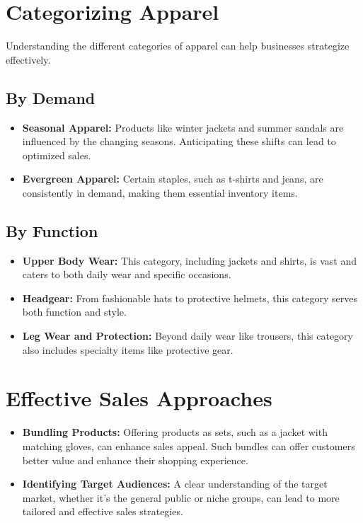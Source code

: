 \documentclass{article}
\begin{document}
\section{Categorizing Apparel}
Understanding the different categories of apparel can help businesses strategize effectively.
\subsection{By Demand}
\begin{itemize}
    \item \textbf{Seasonal Apparel:} Products like winter jackets and summer sandals are influenced by the changing seasons. Anticipating these shifts can lead to optimized sales.
    \item \textbf{Evergreen Apparel:} Certain staples, such as t-shirts and jeans, are consistently in demand, making them essential inventory items.
\end{itemize}
\subsection{By Function}
\begin{itemize}
    \item \textbf{Upper Body Wear:} This category, including jackets and shirts, is vast and caters to both daily wear and specific occasions.
    \item \textbf{Headgear:} From fashionable hats to protective helmets, this category serves both function and style.
    \item \textbf{Leg Wear and Protection:} Beyond daily wear like trousers, this category also includes specialty items like protective gear.
\end{itemize}

\section{Effective Sales Approaches}
\begin{itemize}
    \item \textbf{Bundling Products:} Offering products as sets, such as a jacket with matching gloves, can enhance sales appeal. Such bundles can offer customers better value and enhance their shopping experience.
    \item \textbf{Identifying Target Audiences:} A clear understanding of the target market, whether it's the general public or niche groups, can lead to more tailored and effective sales strategies.
\end{itemize}
\end{document}
